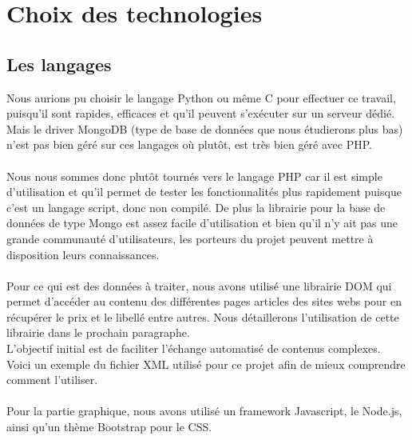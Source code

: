 \documentclass{report}
\begin{document}
\chapter{Choix des technologies}
\section{Les langages}
Nous aurions pu choisir le langage Python ou même C pour effectuer ce travail, puisqu'il sont rapides, efficaces et qu'il peuvent s'exécuter sur un serveur dédié. Mais le driver MongoDB (type de base de données que nous étudierons plus bas) n'est pas bien géré sur ces langages où plutôt, est très bien géré avec PHP.\\\\
Nous nous sommes donc plutôt tournés vers le langage PHP car il est simple d'utilisation et qu'il permet de tester les fonctionnalités plus rapidement puisque c'est un langage script, donc non compilé. De plus la librairie pour la base de données de type Mongo est assez facile d'utilisation et bien qu'il n'y ait pas une grande communauté d'utilisateurs, les porteurs du projet peuvent mettre à disposition leurs connaissances.\\\\
Pour ce qui est des données à traiter, nous avons utilisé une librairie DOM qui permet d'accéder au contenu des différentes pages articles des sites webs pour en récupérer le prix et le libellé entre autres.
Nous détaillerons l'utilisation de cette librairie dans le prochain paragraphe.\\
L'objectif initial est de faciliter l'échange automatisé de contenus complexes.\\
Voici un exemple du fichier XML utilisé pour ce projet afin de mieux comprendre comment l'utiliser.\\\\
Pour la partie graphique, nous avons utilisé un framework Javascript, le Node.js, ainsi qu'un thème Bootstrap pour le CSS.
~\\
\end{document}
